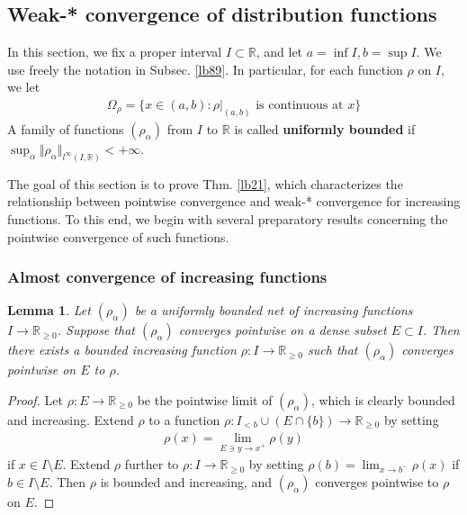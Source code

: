\documentclass[12pt,b5paper,notitlepage]{article}
\theoremstyle{definition}
\theoremstyle{plain}
\newtheorem{lm}[df]{Lemma}
\newcommand{\Rbb}{\mathbb R}
\numberwithin{equation}{section}
\begin{document}
\subsection{Weak-* convergence of distribution functions}


In this section, we fix a proper interval $I\subset\Rbb$, and let $a=\inf I, b=\sup I$. We use freely the notation in Subsec. \ref{lb89}. In particular, for each function $\rho$ on $I$, we let
\begin{align*}
\Omega_\rho=\{x\in(a,b):\rho|_{(a,b)}\text{ is continuous at }x\}
\end{align*}
A family of functions $(\rho_\alpha)$ from $I$ to $\Rbb$ is called \textbf{uniformly bounded} if $\sup_\alpha \Vert\rho_\alpha\Vert_{l^\infty(I,\Rbb)}<+\infty$.

The goal of this section is to prove Thm. \ref{lb21}, which characterizes the relationship between pointwise convergence and weak-* convergence for increasing functions. To this end, we begin with several preparatory results concerning the pointwise convergence of such functions.


\subsubsection{Almost convergence of increasing functions}



\begin{lm}\label{lb90}
Let $(\rho_\alpha)$ be a uniformly bounded net of increasing functions $I\rightarrow\Rbb_{\geq0}$. Suppose that $(\rho_\alpha)$ converges pointwise on a dense subset $E\subset I$. Then there exists a bounded increasing function $\rho:I\rightarrow\Rbb_{\geq0}$ such that $(\rho_\alpha)$ converges pointwise on $E$ to $\rho$.
\end{lm}

\begin{proof}
Let $\rho:E\rightarrow\Rbb_{\geq0}$ be the pointwise limit of $(\rho_\alpha)$, which is clearly bounded and increasing. Extend $\rho$ to a function $\rho:I_{<b}\cup(E\cap\{b\})\rightarrow\Rbb_{\geq0}$ by setting
\begin{align*}
\rho(x)=\lim_{E\ni y\rightarrow x^+}\rho(y)
\end{align*} 
if $x\in I\setminus E$. Extend $\rho$ further to $\rho:I\rightarrow\Rbb_{\geq0}$ by setting $\rho(b)=\lim_{x\rightarrow b^-}\rho(x)$ if $b\in I\setminus E$. Then $\rho$ is bounded and increasing, and $(\rho_\alpha)$ converges pointwise to $\rho$ on $E$.
\end{proof}
\end{document}
